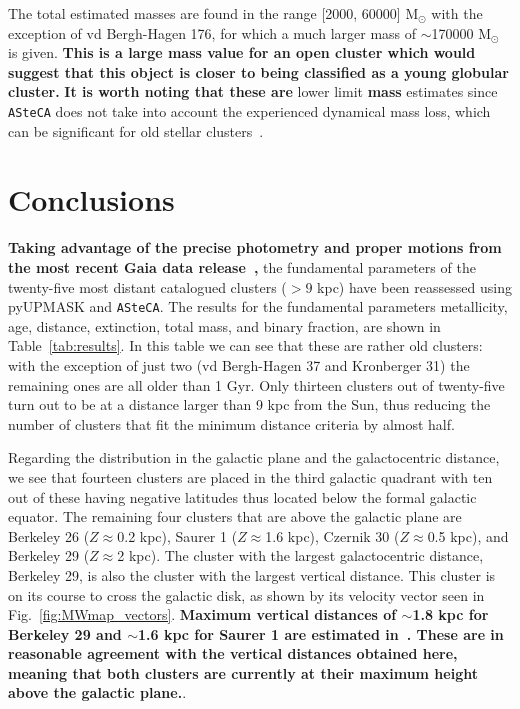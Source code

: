 \documentclass[referee]{aa}
\begin{document}
  The total estimated masses are found in the range [2000, 60000] M$_{\odot}$
  with the exception of vd Bergh-Hagen 176, for which a much
  larger mass of $\sim$170000 M$_{\odot}$ is given. \textbf{This is a large mass
  value for an open cluster which would suggest that this object is closer to
  being classified as a young globular cluster.}
  \textbf{It is worth noting that these are} lower limit \textbf{mass}
  estimates since \texttt{ASteCA} does not take into account the
  experienced dynamical mass loss, which can be significant for old stellar
  clusters~\citep{Martinez_2017}.\\







\section{Conclusions}
 \label{sec:conclusions}

  \textbf{Taking advantage of the precise photometry and proper motions from the
  most recent Gaia data release~\citep{Gaia_EDR3},} the fundamental parameters
  of the twenty-five most distant catalogued clusters ($>9$ kpc) have been
  reassessed using pyUPMASK and \texttt{ASteCA}.
  The results for the fundamental parameters metallicity, age, distance,
  extinction, total mass, and binary fraction, are shown in 
  Table~\ref{tab:results}. In this table we can see that these are
  rather old clusters: with the exception of just two (vd Bergh-Hagen 37 and
  Kronberger 31) the remaining ones are all older than 1 Gyr.
  Only thirteen clusters out of twenty-five turn out to be at a distance larger
  than 9 kpc from the Sun, thus reducing the number of clusters that fit the
  minimum distance criteria by almost half.

  Regarding the distribution in the galactic plane and the galactocentric
  distance, we see that fourteen clusters are placed in the third galactic
  quadrant with ten out of these having negative latitudes thus located below
  the formal galactic equator. The remaining four clusters that are above the
  galactic plane are Berkeley 26 ($Z\approx$0.2 kpc), Saurer 1
  ($Z\approx$1.6 kpc), Czernik 30 ($Z\approx$0.5 kpc), and Berkeley
  29 ($Z\approx$2 kpc). The cluster with the largest galactocentric distance,
  Berkeley 29, is also the cluster with the largest vertical distance. This
  cluster is on its course to cross the galactic disk, as shown by its velocity
  vector seen in Fig.~\ref{fig:MWmap_vectors}. \textbf{Maximum vertical distances
  of $\sim$1.8 kpc for Berkeley 29 and $\sim$1.6 kpc for Saurer 1 are estimated
  in~\cite{Gaia_Collaboration_2021}. These are in reasonable agreement with the
  vertical distances obtained here, meaning that both clusters are currently at
  their maximum height above the galactic plane.}.
\end{document}
